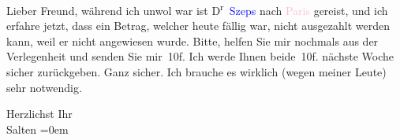 \pstart{}Lieber Freund,\pend
\pstart
           während ich unwol war ist D\textsuperscript{r} \textcolor{blue}{Szeps}{}\ledrightnote{\textcolor{blue}{Julius Szeps}} nach \textcolor{pink}{Paris}{}\ledrightnote{\textcolor{pink}{Paris}} gereist,
               und ich erfahre jetzt, dass ein Betrag, welcher heute
               fällig war, nicht ausgezahlt werden kann, weil er nicht angewiesen wurde. Bitte,
               helfen Sie mir nochmals aus der Verlegenheit und senden Sie mir 10f. Ich werde Ihnen
               beide 10f. nächste Woche sicher zurückgeben. Ganz sicher. Ich brauche es wirklich
               (wegen meiner Leute) sehr notwendig.\pend
           
\pstart
           Herzlichst Ihr {\\[\baselineskip]}\spacefill\mbox{Salten}\pend
           \leftskip=0em{}\endnumbering{}  
      